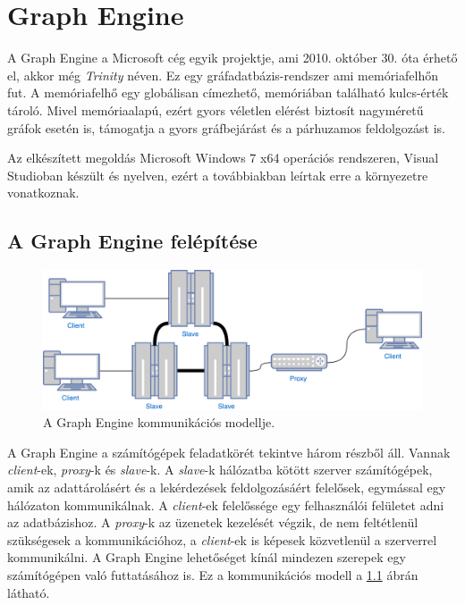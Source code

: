 \chapter{Graph Engine}

A Graph Engine a Microsoft cég egyik projektje, ami 2010. október 30. óta érhető el, akkor még \emph{Trinity} néven.\cite{MicrosoftTrinity} Ez egy gráfadatbázis-rendszer ami memóriafelhőn fut. A memóriafelhő egy globálisan címezhető, memóriában található kulcs-érték tároló. Mivel memóriaalapú, ezért gyors véletlen elérést biztosít nagyméretű gráfok esetén is, támogatja a gyors gráfbejárást és a párhuzamos feldolgozást is.\cite{Trinity}

Az elkészített megoldás Microsoft Windows 7 x64 operációs rendszeren, Visual Studioban készült és \Csh{} nyelven, ezért a továbbiakban leírtak erre a környezetre vonatkoznak.


\section{A Graph Engine felépítése}

\begin{figure}[H]
	\centering
	\includegraphics[width=\linewidth]{figures/GraphEngineModel.pdf}
	\caption{A Graph Engine kommunikációs modellje.}
	\label{fig:GraphEngineModel}
\end{figure}

A Graph Engine a számítógépek feladatkörét tekintve három részből áll.\cite{Trinity} Vannak \emph{client}-ek, \emph{proxy}-k és \emph{slave}-k. A \emph{slave}-k hálózatba kötött szerver számítógépek, amik az adattárolásért és a lekérdezések feldolgozásáért felelősek, egymással egy hálózaton kommunikálnak. A \emph{client}-ek felelőssége egy felhasználói felületet adni az adatbázishoz. A \emph{proxy}-k az üzenetek kezelését végzik, de nem feltétlenül szükségesek a kommunikációhoz, a \emph{client}-ek is képesek közvetlenül a szerverrel kommunikálni. A Graph Engine lehetőséget kínál mindezen szerepek egy számítógépen való futtatásához is. Ez a kommunikációs modell a \ref{fig:GraphEngineModel} ábrán látható.

